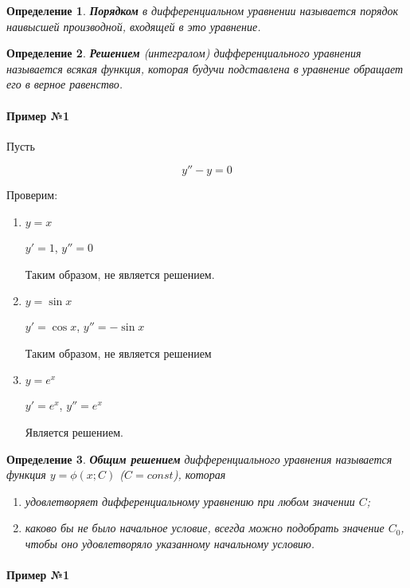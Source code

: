 \documentclass{article}
\newtheorem{definition}{Определение}
\begin{document}
\begin{definition}
    \textbf{Порядком} в дифференциальном уравнении называется порядок наивысшей производной, входящей в это уравнение.
\end{definition}

\begin{definition}
    \textbf{Решением} (интегралом) дифференциального уравнения называется всякая функция, которая будучи подставлена в уравнение обращает его в верное равенство.
\end{definition}

\paragraph{Пример №1}

Пусть

$$y'' - y = 0$$

Проверим:

\begin{enumerate}
    \item $y = x$

    $y' = 1$, $y'' = 0$

    Таким образом, не является решением.
    \item $y = \sin x$

    $y' = \cos x$, $y'' = -\sin x$

    Таким образом, не является решением
    \item $y = e^{x}$

    $y' = e^{x}$, $y'' = e^{x}$

    Является решением.
\end{enumerate}

\begin{definition}
    \textbf{Общим решением} дифференциального уравнения называется функция $y = \phi(x; C)$ ($C = const$), которая
    
    \begin{enumerate}
        \item удовлетворяет дифференциальному уравнению при любом значении $C$;
        \item каково бы не было начальное условие, всегда можно подобрать значение $C_0$, чтобы оно удовлетворяло указанному начальному условию.
    \end{enumerate}
\end{definition}

\paragraph{Пример №1}
\end{document}
